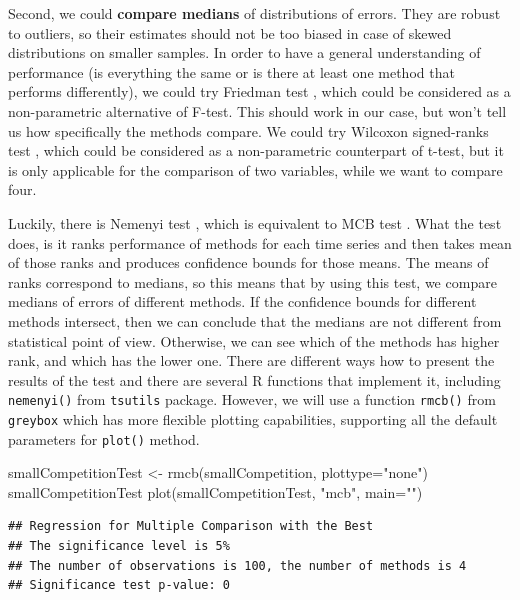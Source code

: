 \documentclass[
]{book}
\newenvironment{Shaded}{\begin{snugshade}}{\end{snugshade}}
\newcommand{\AttributeTok}[1]{\textcolor[rgb]{0.77,0.63,0.00}{#1}}
\newcommand{\FunctionTok}[1]{\textcolor[rgb]{0.00,0.00,0.00}{#1}}
\newcommand{\NormalTok}[1]{#1}
\newcommand{\OtherTok}[1]{\textcolor[rgb]{0.56,0.35,0.01}{#1}}
\newcommand{\StringTok}[1]{\textcolor[rgb]{0.31,0.60,0.02}{#1}}
\theoremstyle{definition}
\theoremstyle{definition}
\theoremstyle{definition}
\theoremstyle{definition}
\theoremstyle{remark}
\begin{document}
Second, we could \textbf{compare medians} of distributions of errors. They are robust to outliers, so their estimates should not be too biased in case of skewed distributions on smaller samples. In order to have a general understanding of performance (is everything the same or is there at least one method that performs differently), we could try Friedman test \citep{WikipediaFriedmanTest}, which could be considered as a non-parametric alternative of F-test. This should work in our case, but won't tell us how specifically the methods compare. We could try Wilcoxon signed-ranks test \citep{WikipediaWilcoxonTest}, which could be considered as a non-parametric counterpart of t-test, but it is only applicable for the comparison of two variables, while we want to compare four.

Luckily, there is Nemenyi test \citep{Demsar2006}, which is equivalent to MCB test \citep[\citet{KourentzesWeb2012}]{Koning2005}. What the test does, is it ranks performance of methods for each time series and then takes mean of those ranks and produces confidence bounds for those means. The means of ranks correspond to medians, so this means that by using this test, we compare medians of errors of different methods. If the confidence bounds for different methods intersect, then we can conclude that the medians are not different from statistical point of view. Otherwise, we can see which of the methods has higher rank, and which has the lower one. There are different ways how to present the results of the test and there are several R functions that implement it, including \texttt{nemenyi()} from \texttt{tsutils} package. However, we will use a function \texttt{rmcb()} from \texttt{greybox} which has more flexible plotting capabilities, supporting all the default parameters for \texttt{plot()} method.

\begin{Shaded}
\begin{Highlighting}[]
\NormalTok{smallCompetitionTest }\OtherTok{\textless{}{-}} \FunctionTok{rmcb}\NormalTok{(smallCompetition, }\AttributeTok{plottype=}\StringTok{"none"}\NormalTok{)}
\NormalTok{smallCompetitionTest}
\FunctionTok{plot}\NormalTok{(smallCompetitionTest, }\StringTok{"mcb"}\NormalTok{, }\AttributeTok{main=}\StringTok{""}\NormalTok{)}
\end{Highlighting}
\end{Shaded}

\begin{verbatim}
## Regression for Multiple Comparison with the Best
## The significance level is 5%
## The number of observations is 100, the number of methods is 4
## Significance test p-value: 0
\end{verbatim}
\end{document}
